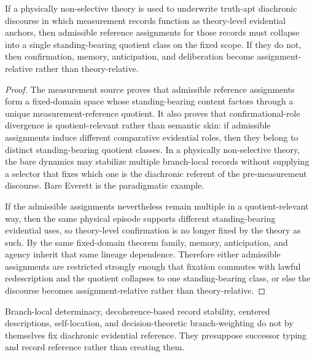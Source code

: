 \begin{theorem}
\label{thm:measurement-reference-application}
If a physically non-selective theory is used to underwrite truth-apt diachronic discourse in which measurement records function as theory-level evidential anchors, then admissible reference assignments for those records must collapse into a single standing-bearing quotient class on the fixed scope. If they do not, then confirmation, memory, anticipation, and deliberation become assignment-relative rather than theory-relative.
\end{theorem}

\begin{proof}
The measurement source proves that admissible reference assignments form a fixed-domain space whose standing-bearing content factors through a unique measurement-reference quotient. It also proves that confirmational-role divergence is quotient-relevant rather than semantic skin: if admissible assignments induce different comparative evidential roles, then they belong to distinct standing-bearing quotient classes. In a physically non-selective theory, the bare dynamics may stabilize multiple branch-local records without supplying a selector that fixes which one is the diachronic referent of the pre-measurement discourse. Bare Everett is the paradigmatic example.

If the admissible assignments nevertheless remain multiple in a quotient-relevant way, then the same physical episode supports different standing-bearing evidential uses, so theory-level confirmation is no longer fixed by the theory as such. By the same fixed-domain theorem family, memory, anticipation, and agency inherit that same lineage dependence. Therefore either admissible assignments are restricted strongly enough that fixation commutes with lawful redescription and the quotient collapses to one standing-bearing class, or else the discourse becomes assignment-relative rather than theory-relative.
\end{proof}

\begin{corollary}
Branch-local determinacy, decoherence-based record stability, centered descriptions, self-location, and decision-theoretic branch-weighting do not by themselves fix diachronic evidential reference. They presuppose successor typing and record reference rather than creating them.
\end{corollary}

